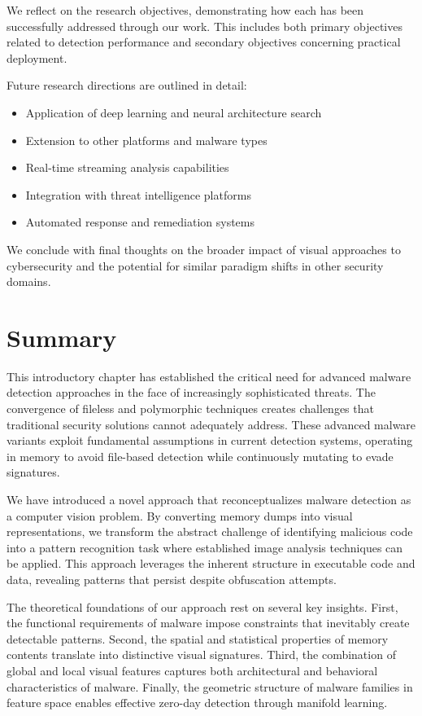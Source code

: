 We reflect on the research objectives, demonstrating how each has been successfully addressed through our work. This includes both primary objectives related to detection performance and secondary objectives concerning practical deployment.

Future research directions are outlined in detail:
\begin{itemize}
\item Application of deep learning and neural architecture search
\item Extension to other platforms and malware types
\item Real-time streaming analysis capabilities
\item Integration with threat intelligence platforms
\item Automated response and remediation systems
\end{itemize}

We conclude with final thoughts on the broader impact of visual approaches to cybersecurity and the potential for similar paradigm shifts in other security domains.

\section{Summary}
\label{sec:intro_summary}

This introductory chapter has established the critical need for advanced malware detection approaches in the face of increasingly sophisticated threats. The convergence of fileless and polymorphic techniques creates challenges that traditional security solutions cannot adequately address. These advanced malware variants exploit fundamental assumptions in current detection systems, operating in memory to avoid file-based detection while continuously mutating to evade signatures.

We have introduced a novel approach that reconceptualizes malware detection as a computer vision problem. By converting memory dumps into visual representations, we transform the abstract challenge of identifying malicious code into a pattern recognition task where established image analysis techniques can be applied. This approach leverages the inherent structure in executable code and data, revealing patterns that persist despite obfuscation attempts.

The theoretical foundations of our approach rest on several key insights. First, the functional requirements of malware impose constraints that inevitably create detectable patterns. Second, the spatial and statistical properties of memory contents translate into distinctive visual signatures. Third, the combination of global and local visual features captures both architectural and behavioral characteristics of malware. Finally, the geometric structure of malware families in feature space enables effective zero-day detection through manifold learning.

